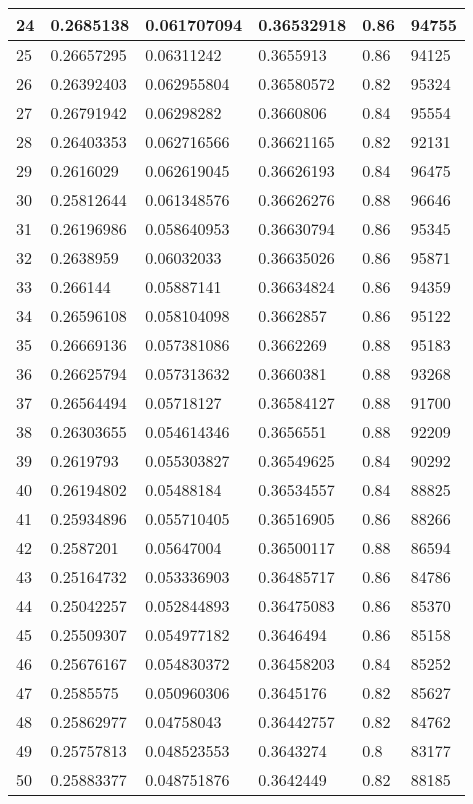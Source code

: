 \begin{longtable}{|l|l|l|l|l|l|}
24 & 0.2685138 & 0.061707094 & 0.36532918 & 0.86 & 94755 \\ \hline 
25 & 0.26657295 & 0.06311242 & 0.3655913 & 0.86 & 94125 \\ \hline 
26 & 0.26392403 & 0.062955804 & 0.36580572 & 0.82 & 95324 \\ \hline 
27 & 0.26791942 & 0.06298282 & 0.3660806 & 0.84 & 95554 \\ \hline 
28 & 0.26403353 & 0.062716566 & 0.36621165 & 0.82 & 92131 \\ \hline 
29 & 0.2616029 & 0.062619045 & 0.36626193 & 0.84 & 96475 \\ \hline 
30 & 0.25812644 & 0.061348576 & 0.36626276 & 0.88 & 96646 \\ \hline 
31 & 0.26196986 & 0.058640953 & 0.36630794 & 0.86 & 95345 \\ \hline 
32 & 0.2638959 & 0.06032033 & 0.36635026 & 0.86 & 95871 \\ \hline 
33 & 0.266144 & 0.05887141 & 0.36634824 & 0.86 & 94359 \\ \hline 
34 & 0.26596108 & 0.058104098 & 0.3662857 & 0.86 & 95122 \\ \hline 
35 & 0.26669136 & 0.057381086 & 0.3662269 & 0.88 & 95183 \\ \hline 
36 & 0.26625794 & 0.057313632 & 0.3660381 & 0.88 & 93268 \\ \hline 
37 & 0.26564494 & 0.05718127 & 0.36584127 & 0.88 & 91700 \\ \hline 
38 & 0.26303655 & 0.054614346 & 0.3656551 & 0.88 & 92209 \\ \hline 
39 & 0.2619793 & 0.055303827 & 0.36549625 & 0.84 & 90292 \\ \hline 
40 & 0.26194802 & 0.05488184 & 0.36534557 & 0.84 & 88825 \\ \hline 
41 & 0.25934896 & 0.055710405 & 0.36516905 & 0.86 & 88266 \\ \hline 
42 & 0.2587201 & 0.05647004 & 0.36500117 & 0.88 & 86594 \\ \hline 
43 & 0.25164732 & 0.053336903 & 0.36485717 & 0.86 & 84786 \\ \hline 
44 & 0.25042257 & 0.052844893 & 0.36475083 & 0.86 & 85370 \\ \hline 
45 & 0.25509307 & 0.054977182 & 0.3646494 & 0.86 & 85158 \\ \hline 
46 & 0.25676167 & 0.054830372 & 0.36458203 & 0.84 & 85252 \\ \hline 
47 & 0.2585575 & 0.050960306 & 0.3645176 & 0.82 & 85627 \\ \hline 
48 & 0.25862977 & 0.04758043 & 0.36442757 & 0.82 & 84762 \\ \hline 
49 & 0.25757813 & 0.048523553 & 0.3643274 & 0.8 & 83177 \\ \hline 
50 & 0.25883377 & 0.048751876 & 0.3642449 & 0.82 & 88185 \\ \hline 
\end{longtable}